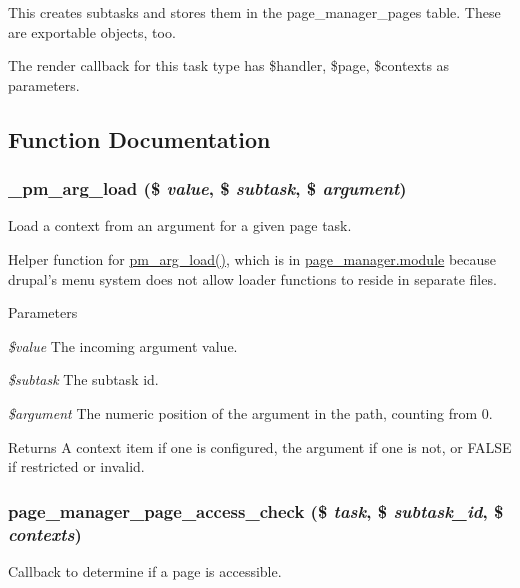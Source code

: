 This creates subtasks and stores them in the page\_\-manager\_\-pages table. These are exportable objects, too.

The render callback for this task type has \$handler, \$page, \$contexts as parameters. 

\subsection{Function Documentation}
\hypertarget{page_8inc_aac7c9639394ed3bc6d64db4b2e752465}{
\subsubsection[{\_\-pm\_\-arg\_\-load}]{\setlength{\rightskip}{0pt plus 5cm}\_\-pm\_\-arg\_\-load (\$ {\em value}, \/  \$ {\em subtask}, \/  \$ {\em argument})}}
\label{page_8inc_aac7c9639394ed3bc6d64db4b2e752465}
Load a context from an argument for a given page task.

Helper function for \hyperlink{page__manager_8module_afb6c50228189e10200373039a7a703ee}{pm\_\-arg\_\-load()}, which is in \hyperlink{page__manager_8module}{page\_\-manager.module} because drupal's menu system does not allow loader functions to reside in separate files.


\begin{DoxyParams}{Parameters}
\item[{\em \$value}]The incoming argument value. \item[{\em \$subtask}]The subtask id. \item[{\em \$argument}]The numeric position of the argument in the path, counting from 0.\end{DoxyParams}
\begin{DoxyReturn}{Returns}
A context item if one is configured, the argument if one is not, or FALSE if restricted or invalid. 
\end{DoxyReturn}
\hypertarget{page_8inc_a151ef88a466094b0056f0250dc22552b}{
\subsubsection[{page\_\-manager\_\-page\_\-access\_\-check}]{\setlength{\rightskip}{0pt plus 5cm}page\_\-manager\_\-page\_\-access\_\-check (\$ {\em task}, \/  \$ {\em subtask\_\-id}, \/  \$ {\em contexts})}}
\label{page_8inc_a151ef88a466094b0056f0250dc22552b}
Callback to determine if a page is accessible.


